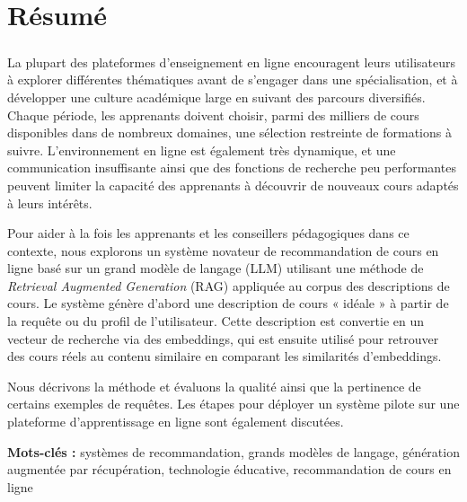  

\chapter*{Résumé}

\paragraph{}\begin{spacing}{2}

La plupart des plateformes d’enseignement en ligne encouragent leurs utilisateurs à explorer différentes thématiques avant de s’engager dans une spécialisation, et à développer une culture académique large en suivant des parcours diversifiés. Chaque période, les apprenants doivent choisir, parmi des milliers de cours disponibles dans de nombreux domaines, une sélection restreinte de formations à suivre. L’environnement en ligne est également très dynamique, et une communication insuffisante ainsi que des fonctions de recherche peu performantes peuvent limiter la capacité des apprenants à découvrir de nouveaux cours adaptés à leurs intérêts.

Pour aider à la fois les apprenants et les conseillers pédagogiques dans ce contexte, nous explorons un système novateur de recommandation de cours en ligne basé sur un grand modèle de langage (LLM) utilisant une méthode de \textit{Retrieval Augmented Generation} (RAG) appliquée au corpus des descriptions de cours. Le système génère d’abord une description de cours « idéale » à partir de la requête ou du profil de l’utilisateur. Cette description est convertie en un vecteur de recherche via des embeddings, qui est ensuite utilisé pour retrouver des cours réels au contenu similaire en comparant les similarités d’embeddings.

Nous décrivons la méthode et évaluons la qualité ainsi que la pertinence de certains exemples de requêtes. Les étapes pour déployer un système pilote sur une plateforme d’apprentissage en ligne sont également discutées.

\medskip

\textbf{Mots-clés :} systèmes de recommandation, grands modèles de langage, génération augmentée par récupération, technologie éducative, recommandation de cours en ligne
\end{spacing}